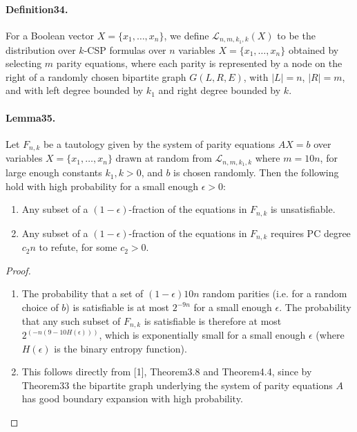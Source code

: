 \paragraph{Definition34.} For a Boolean vector $X=\{x_1,\ldots,x_n\}$, we define $\mathcal L_{n,m,k_1,k}(X)$ to be the distribution over $k$-CSP formulas over $n$ variables $X=\{x_1,\ldots,x_n\}$ obtained by selecting $m$ parity equations, where each parity is represented by a node on the right of a randomly chosen bipartite graph $G(L,R,E)$, with $|L|=n$, $|R|=m$, and with left degree bounded by $k_1$ and right degree bounded by $k$.
\paragraph{Lemma35.} Let $F_{n,k}$ be a tautology given by the system of parity equations $AX=b$ over variables $X=\{x_1,\ldots,x_n\}$ drawn at random from $\mathcal L_{n,m,k_1,k}$ where $m=10n$, for large enough constants $k_1,k>0$, and $b$ is chosen randomly. Then the following hold with high probability for a small enough $\epsilon>0$:
\begin{enumerate}[label=\alph*)]
\item Any subset of a $(1-\epsilon)$-fraction of the equations in $F_{n,k}$ is unsatisfiable.
\item Any subset of a $(1-\epsilon)$-fraction of the equations in $F_{n,k}$ requires PC degree $c_2n$ to refute, for some $c_2>0$.
\end{enumerate}
\begin{proof}
\begin{enumerate}[label=\alph*)]
\item The probability that a set of $(1-\epsilon)10n$ random parities (i.e. for a random choice of $b$) is satisfiable is at most $2^{-9n}$ for a small enough $\epsilon$. The probability that any such subset of $F_{n,k}$ is satisfiable is therefore at most $2^{(-n(9-10H(\epsilon)))}$, which is exponentially small for a small enough $\epsilon$ (where $H(\epsilon)$ is the binary entropy function).
\item This follows directly from [1], Theorem3.8 and Theorem4.4, since by Theorem33 the bipartite graph underlying the system of parity equations $A$ has good boundary expansion with high probability.
\end{enumerate}
\end{proof}
